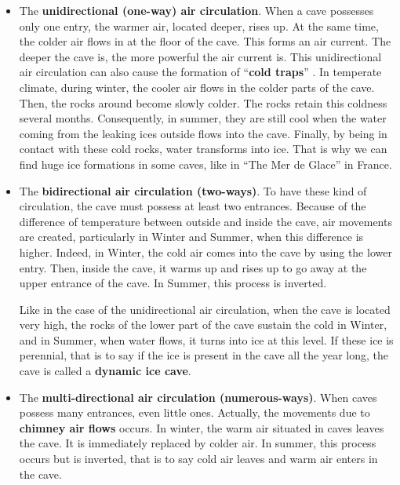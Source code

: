 \documentclass[draft, final]{report}
\begin{document}
\begin{itemize}

  \item The \textbf{unidirectional (one-way) air circulation}. When a cave possesses only one entry, the warmer air, located deeper, rises up.  At the same time, the colder air flows in at the floor of the cave. This forms an air current. The deeper the cave is, the more powerful the air current is. This unidirectional air circulation can also cause the formation of “\textbf{cold traps}” . In temperate climate, during winter, the cooler air flows in the colder parts of the cave. Then, the rocks around become slowly colder. The rocks retain this coldness several 	months. Consequently, in summer, they are still cool when the water coming from the leaking ices outside flows into the cave. Finally, by being in contact with these cold rocks, water transforms into ice. That is why we can find huge ice formations in some caves, like in “The Mer de Glace” in France.

  \item The \textbf{bidirectional air circulation (two-ways)}. To have these kind of circulation, the cave must possess at least two entrances. Because of the difference of temperature between outside and inside the cave, air movements are created, particularly in Winter and Summer, when this difference is higher. Indeed, in Winter, the cold air comes into the cave by using the lower entry. Then, inside the cave, it warms up and rises up to go away at the upper entrance of the cave. In Summer, this process is inverted. \par
  Like in the case of the unidirectional air circulation, when the cave is located very high, the rocks of the lower part of the cave sustain the cold in Winter, and in Summer, when water flows, it turns into ice at this level. If these ice is perennial, that is to say if the ice is present in the cave all the year long, the cave is called a \textbf{dynamic ice cave}.

  \item The \textbf{multi-directional air circulation (numerous-ways)}. When caves possess many entrances, even little ones. Actually, the movements due to \textbf{chimney air flows} occurs. In winter, the warm air situated in caves leaves the cave. It is immediately replaced by colder air. In summer, this process occurs but is inverted, that is to say cold air leaves and warm air enters in the cave.

\end{itemize}
\end{document}

